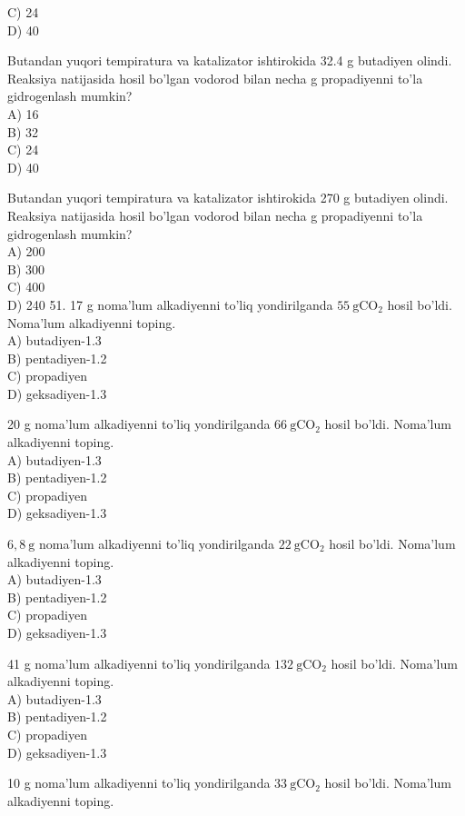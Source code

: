 C) 24\\
D) 40
  \item Butandan yuqori tempiratura va katalizator ishtirokida 32.4 g butadiyen olindi. Reaksiya natijasida hosil bo'lgan vodorod bilan necha g propadiyenni to'la gidrogenlash mumkin?\\
A) 16\\
B) 32\\
C) 24\\
D) 40
  \item Butandan yuqori tempiratura va katalizator ishtirokida 270 g butadiyen olindi. Reaksiya natijasida hosil bo'lgan vodorod bilan necha g propadiyenni to'la gidrogenlash mumkin?\\
A) 200\\
B) 300\\
C) 400\\
D) 240
51. 17 g noma'lum alkadiyenni to'liq yondirilganda $55 \mathrm{~g} \mathrm{CO}_{2}$ hosil bo'ldi. Noma'lum alkadiyenni toping.\\
A) butadiyen-1.3\\
B) pentadiyen-1.2\\
C) propadiyen\\
D) geksadiyen-1.3
  \item 20 g noma'lum alkadiyenni to'liq yondirilganda $66 \mathrm{~g} \mathrm{CO}_{2}$ hosil bo'ldi. Noma'lum alkadiyenni toping.\\
A) butadiyen-1.3\\
B) pentadiyen-1.2\\
C) propadiyen\\
D) geksadiyen-1.3
  \item $6,8 \mathrm{~g}$ noma'lum alkadiyenni to'liq yondirilganda $22 \mathrm{~g} \mathrm{CO}_{2}$ hosil bo'ldi. Noma'lum alkadiyenni toping.\\
A) butadiyen-1.3\\
B) pentadiyen-1.2\\
C) propadiyen\\
D) geksadiyen-1.3
  \item 41 g noma'lum alkadiyenni to'liq yondirilganda $132 \mathrm{~g} \mathrm{CO}_{2}$ hosil bo'ldi. Noma'lum alkadiyenni toping.\\
A) butadiyen-1.3\\
B) pentadiyen-1.2\\
C) propadiyen\\
D) geksadiyen-1.3
  \item 10 g noma'lum alkadiyenni to'liq yondirilganda $33 \mathrm{~g} \mathrm{CO}_{2}$ hosil bo'ldi. Noma'lum alkadiyenni toping.\\
